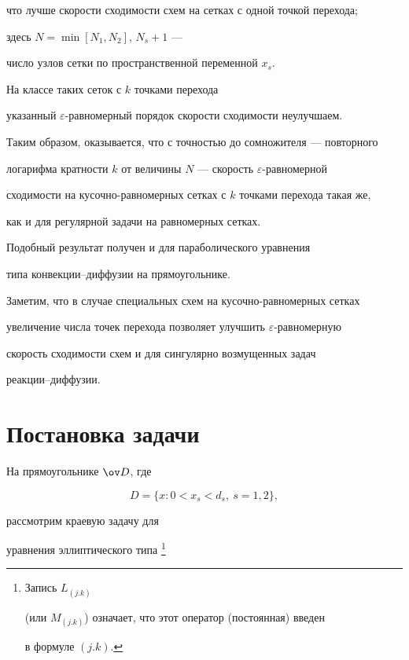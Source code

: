что лучше скорости сходимости схем на сетках с одной точкой перехода;


здесь $N=\min[N_1, N_2]$, $N_s+1$ ---


число узлов сетки по пространственной переменной $x_s$.


На классе таких сеток с $k$ точками перехода


указанный $\varepsilon$-равномерный порядок скорости сходимости неулучшаем.





Таким образом, оказывается, что с точностью до сомножителя --- повторного


логарифма кратности $k$ от величины $N$ --- скорость $\varepsilon$-равномерной


сходимости на кусочно-равномерных сетках с $k$ точками перехода такая же,


как и для регулярной задачи на равномерных сетках.


Подобный результат получен и для параболического уравнения


типа конвекции--диффузии на прямоугольнике.


Заметим, что в случае специальных схем на кусочно-равномерных сетках


увеличение числа точек перехода позволяет улучшить $\varepsilon$-равномерную


скорость сходимости схем и для сингулярно возмущенных задач


реакции--диффузии.





\section{Постановка задачи}\label{section.2}





На прямоугольнике  $\ov D$, где


\begin{equation} \label{eq.2.1}


D=\{x:0<x_s<d_s, \ s=1, 2\},


\end{equation}


рассмотрим краевую задачу для


уравнения эллиптического типа \footnote{Запись $L_{(j.k)}$


(или $M_{(j.k)}$) означает, что этот оператор (постоянная) введен


в формуле $(j.k)$.}


